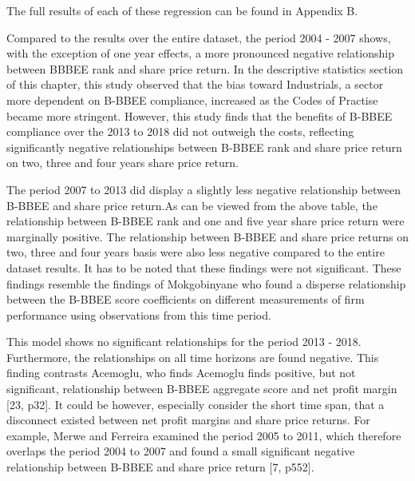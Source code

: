 The full results of each of these regression can be found in Appendix B.

Compared to the results over the entire dataset, the period 2004 - 2007 shows, with the exception of one year effects, a more pronounced negative relationship between BBBEE rank and share price return. In the descriptive statistics section of this chapter, this study observed that the bias toward Industrials, a sector more dependent on B-BBEE compliance, increased as the Codes of Practise became more stringent. However, this study finds that the benefits of B-BBEE compliance over the 2013 to 2018 did not outweigh the costs, reflecting significantly negative relationships between B-BBEE rank and share price return on two, three and four years share price return.

The period 2007 to 2013 did display a slightly less negative relationship between B-BBEE and share price return.As can be viewed from the above table, the relationship between B-BBEE rank and one and five year share price return were marginally positive. The relationship between B-BBEE and share price returns on two, three and four years basis were also less negative compared to the entire dataset results. It has to be noted that these findings were not significant. These findings resemble the findings of Mokgobinyane who found a disperse relationship between the B-BBEE score coefficients on different measurements of firm performance using observations from this time period.

This model shows no significant relationships for the period 2013 - 2018. Furthermore, the relationships on all time horizons are found negative. This finding contrasts Acemoglu, who finds Acemoglu finds positive, but not significant, relationship between B-BBEE aggregate score and net profit margin [23, p32]. It could be however, especially consider the short time span, that a disconnect existed between net profit margins and share price returns. For example, Merwe and Ferreira examined the period 2005 to 2011, which therefore overlaps the period 2004 to 2007 and found a small significant negative relationship between B-BBEE and share price return [7, p552].
